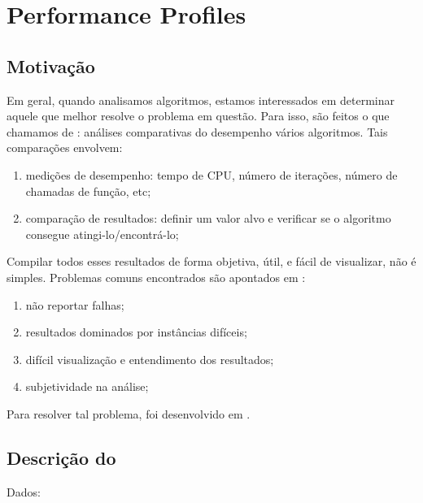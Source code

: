 \section{Performance Profiles}

\subsection{Motivação}
\label{subsection:motivation-perfprof}

Em geral, quando analisamos algoritmos, estamos interessados em determinar aquele que melhor resolve o problema em questão. Para isso, são feitos o que chamamos de \benchmarks: análises comparativas do desempenho vários algoritmos. Tais comparações envolvem:

\begin{enumerate}
    \item medições de desempenho: tempo de CPU, número de iterações, número de chamadas de função, etc;
    \item comparação de resultados: definir um valor alvo e verificar se o algoritmo consegue atingi-lo/encontrá-lo;
\end{enumerate}

Compilar todos esses resultados de forma objetiva, útil, e fácil de visualizar, não é simples. Problemas comuns encontrados são apontados em \cite{bib:performance-profile}:

\begin{enumerate}
    \item não reportar falhas;
    \item resultados dominados por instâncias difíceis;
    \item difícil visualização e entendimento dos resultados;
    \item subjetividade na análise;
\end{enumerate}

Para resolver tal problema, foi desenvolvido em \cite{bib:performance-profile} \perfprof.

\subsection{Descrição do \perfprof}

Dados:

